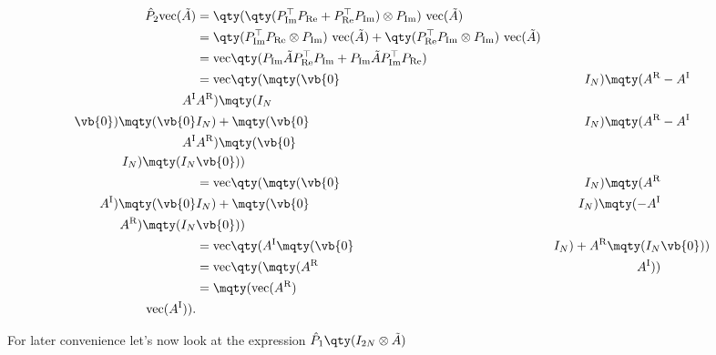 \documentclass{article}
\newcommand{\AR}{A^{\text{R}}}
\newcommand{\AI}{A^{\text{I}}}
\newcommand{\Pre}{P_{\text{Re}}}
\newcommand{\Pim}{P_{\text{Im}}}
\begin{document}
\begin{align*}
  \hat P_2 \text{vec}(\tilde A) 
  &= \qty(\qty(\Pim^\top\Pre + \Pre^\top\Pim) \otimes \Pim) \ \text{vec}(\tilde A) \\
  &= \qty(\Pim^\top\Pre \otimes \Pim) \ \text{vec}(\tilde A) + \qty(\Pre^\top\Pim \otimes \Pim) \ \text{vec}(\tilde A) \\
  &= \text{vec}\qty(\Pim \tilde A \Pre^\top\Pim + \Pim \tilde A \Pim^\top\Pre) \\
  &= \text{vec}\qty(\mqty(\vb{0} & I_N) \mqty(\AR & -\AI \\ \AI & \AR) \mqty(I_N \\ \vb{0}) \mqty(\vb{0} & I_N) + \mqty(\vb{0} & I_N) \mqty(\AR & -\AI \\ \AI & \AR) \mqty(\vb{0} \\ I_N) \mqty(I_N & \vb{0})) \\
  &= \text{vec}\qty(\mqty(\vb{0} & I_N) \mqty(\AR \\ \AI) \mqty(\vb{0} & I_N) + \mqty(\vb{0} & I_N) \mqty(-\AI \\ \AR) \mqty(I_N & \vb{0})) \\
  &= \text{vec}\qty(\AI \mqty(\vb{0} & I_N) + \AR \mqty(I_N & \vb{0})) \\
  &= \text{vec}\qty(\mqty(\AR & \AI)) \\
  &= \mqty(\text{vec}(\AR) \\ \text{vec}(\AI)).
\end{align*}

For later convenience let's now look at the expression $\hat P_1 \qty(I_{2N} \otimes \tilde A)$
\end{document}
